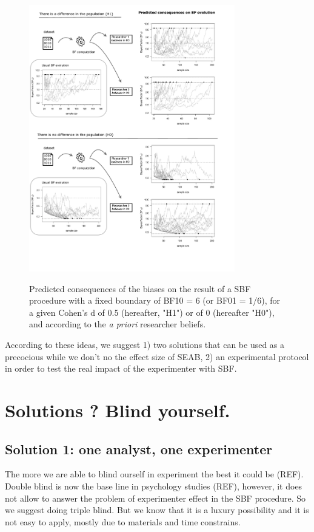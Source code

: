 \documentclass[a4paper,man,natbib,floatsintext,donotrepeattitle]{apa6}
\begin{document}
\begin{figure}[H]
  \caption{Predicted consequences of the biases on the result of a SBF procedure with a fixed boundary of BF10 = 6 (or BF01 = 1/6), for a given Cohen's d of 0.5 (hereafter, "H1") or of 0 (hereafter "H0"), and according to the \emph{a priori} researcher beliefs.}
  \centering
  \includegraphics[width=0.8\textwidth]{figures/BFF_predictions.pdf}
  \label{fig:pred}
\end{figure}


According to these ideas, we suggest 1) two solutions that can be used as a precocious while we don't no the effect size of SEAB, 2) an experimental protocol in order to test the real impact of the experimenter with SBF. 

\section{Solutions ? Blind yourself.}

\subsection{Solution 1: one analyst, one experimenter}
The more we are able to blind ourself in experiment the best it could be (REF). Double blind is now the base line in psychology studies (REF), however, it does not allow to answer the problem of experimenter effect in the SBF procedure. So we suggest doing triple blind. But we know that it is a luxury possibility and it is not easy to apply, mostly due to materials and time constrains.   
\end{document}
